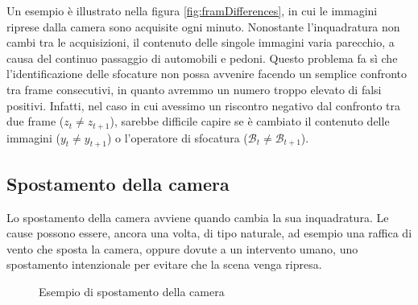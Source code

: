 \noindent Un esempio \`e illustrato nella figura \ref{fig:framDifferences}, in cui le immagini riprese dalla camera sono acquisite ogni minuto. 
Nonostante l'inquadratura non cambi tra le acquisizioni, il contenuto delle singole immagini varia parecchio, a causa del continuo passaggio di automobili e pedoni.
Questo problema fa s\`i che l'identificazione delle sfocature non possa avvenire facendo un semplice confronto tra frame consecutivi, in quanto avremmo un numero troppo elevato di falsi positivi.
Infatti, nel caso in cui avessimo un riscontro negativo dal confronto tra due frame ($z_t \neq z_{t + 1}$), sarebbe difficile capire se \`e cambiato il contenuto delle immagini ($y_t \neq y_{t + 1}$) o l'operatore di sfocatura ($\mathcal{B}_t \neq \mathcal{B}_{t + 1}$). 
\subsection{Spostamento della camera}
\label{displacement}
Lo spostamento della camera avviene quando cambia la sua inquadratura.
Le cause possono essere, ancora una volta, di tipo naturale, ad esempio una raffica di vento che sposta la camera, oppure dovute a un intervento umano, uno spostamento intenzionale per evitare che la scena venga ripresa.
\begin{figure}
	\centering
	\caption{Esempio di spostamento della camera}
	\label{fig:testiDISPLACEMENT}
\end{figure}
